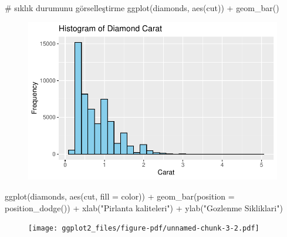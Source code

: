 \documentclass[
  letterpaper,
  DIV=11,
  numbers=noendperiod]{scrreprt}
\newenvironment{Shaded}{\begin{snugshade}}{\end{snugshade}}
\newcommand{\AttributeTok}[1]{\textcolor[rgb]{0.40,0.45,0.13}{#1}}
\newcommand{\CommentTok}[1]{\textcolor[rgb]{0.37,0.37,0.37}{#1}}
\newcommand{\FunctionTok}[1]{\textcolor[rgb]{0.28,0.35,0.67}{#1}}
\newcommand{\NormalTok}[1]{\textcolor[rgb]{0.00,0.23,0.31}{#1}}
\newcommand{\SpecialCharTok}[1]{\textcolor[rgb]{0.37,0.37,0.37}{#1}}
\newcommand{\StringTok}[1]{\textcolor[rgb]{0.13,0.47,0.30}{#1}}
\begin{document}
\begin{Shaded}
\begin{Highlighting}[]
\CommentTok{\# sıklık durumunu görselleştirme}
\FunctionTok{ggplot}\NormalTok{(diamonds, }\FunctionTok{aes}\NormalTok{(cut)) }\SpecialCharTok{+}
  \FunctionTok{geom\_bar}\NormalTok{()}
\end{Highlighting}
\end{Shaded}

\begin{figure}[H]

{\centering \includegraphics{ggplot2_files/figure-pdf/unnamed-chunk-3-1.pdf}

}

\end{figure}

\begin{Shaded}
\begin{Highlighting}[]
\FunctionTok{ggplot}\NormalTok{(diamonds, }\FunctionTok{aes}\NormalTok{(cut, }\AttributeTok{fill =}\NormalTok{ color)) }\SpecialCharTok{+}
  \FunctionTok{geom\_bar}\NormalTok{(}\AttributeTok{position =} \FunctionTok{position\_dodge}\NormalTok{()) }\SpecialCharTok{+} 
  \FunctionTok{xlab}\NormalTok{(}\StringTok{"Pirlanta kaliteleri"}\NormalTok{) }\SpecialCharTok{+} 
  \FunctionTok{ylab}\NormalTok{(}\StringTok{"Gozlenme Sikliklari"}\NormalTok{)}
\end{Highlighting}
\end{Shaded}

\begin{figure}[H]

{\centering \texttt{[image: ggplot2\_files/figure-pdf/unnamed-chunk-3-2.pdf]}

}

\end{figure}
\end{document}
